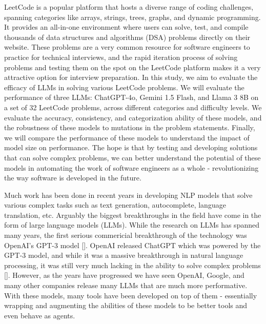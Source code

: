 \documentclass[times, 10pt,twocolumn]{article}
\begin{document}
LeetCode is a popular platform that hosts a diverse range of coding challenges, spanning categories like arrays, strings, trees, graphs, and dynamic programming. It provides an all-in-one environment where users can solve, test, and compile thousands of data structures and algorithms (DSA) problems directly on their website. These problems are a very common resource for software engineers to practice for technical interviews, and the rapid iteration process of solving problems and testing them on the spot on the LeetCode platform makes it a very attractive option for interview preparation. In this study, we aim to evaluate the efficacy of LLMs in solving various LeetCode problems. We will evaluate the performance of three LLMs: ChatGPT-4o, Gemini 1.5 Flash, and Llama 3 8B on a set of 32 LeetCode problems, across different categories and difficulty levels. We evaluate the accuracy, consistency, and categorization ability of these models, and the robustness of these models to mutations in the problem statements. Finally, we will compare the performance of these models to understand the impact of model size on performance. The hope is that by testing and developing solutions that can solve complex problems, we can better understand the potential of these models in automating the work of software engineers as a whole - revolutionizing the way software is developed in the future.



Much work has been done in recent years in developing NLP models that solve various complex tasks such as text generation, autocomplete, language translation, etc. Arguably the biggest breakthroughs in the field have come in the form of large language models (LLMs). While the research on LLMs has spanned many years, the first serious commericial breakthrough of the technology was OpenAI's GPT-3 model []. OpenAI released ChatGPT which was powered by the GPT-3 model, and while it was a massive breakthrough in natural language processing, it was still very much lacking in the ability to solve complex problems []. However, as the years have progressed we have seen OpenAI, Google, and many other companies release many LLMs that are much more performative. With these models, many tools have been developed on top of them - essentially wrapping and augmenting the abilities of these models to be better tools and even behave as agents.
\end{document}
